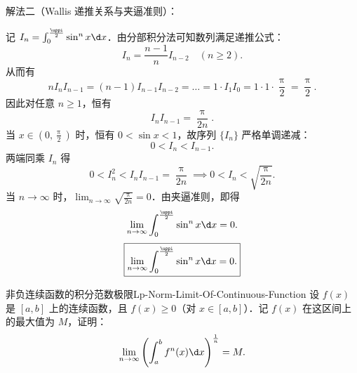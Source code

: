 \begin{solution}
    解法二（Wallis 递推关系与夹逼准则）：

    记 $I_n = \int_0^{\frac{\uppi}{2}} \sin^n x \d x$．由分部积分法可知数列满足递推公式：
    \begin{equation}
        I_n = \frac{n-1}{n} I_{n-2} \quad (n \geqslant 2).
    \end{equation}
    从而有
    \begin{equation}
        n I_n I_{n-1} = (n-1) I_{n-1} I_{n-2} = \dots = 1 \cdot I_1 I_0 = 1 \cdot 1 \cdot \frac{\uppi}{2} = \frac{\uppi}{2}.
    \end{equation}
    因此对任意 $n \geqslant 1$，恒有
    \begin{equation}
        I_n I_{n-1} = \frac{\uppi}{2n}.
    \end{equation}
    当 $x \in \left(0, \frac{\uppi}{2}\right)$ 时，恒有 $0 < \sin x < 1$，故序列 $\{I_n\}$ 严格单调递减：
    \begin{equation}
        0 < I_n < I_{n-1}.
    \end{equation}
    两端同乘 $I_n$ 得
    \begin{equation}
        0 < I_n^2 < I_n I_{n-1} = \frac{\uppi}{2n} \implies 0 < I_n < \sqrt{\frac{\uppi}{2n}}.
    \end{equation}
    当 $n \to \infty$ 时，$\lim_{n\to \infty} \sqrt{\frac{\uppi}{2n}} = 0$．由夹逼准则，即得
    \begin{equation}
        \lim_{n\to \infty} \int_0^{\frac{\uppi}{2}} \sin^n x \d x = 0.
    \end{equation}
    \begin{equation}
        \boxed{\lim_{n\to \infty} \int_0^{\frac{\uppi}{2}} \sin^n x \d x = 0.}
    \end{equation}
\end{solution}

\begin{problem}{非负连续函数的积分范数极限}{Lp-Norm-Limit-Of-Continuous-Function}
    设 $f(x)$ 是 $[a, b]$ 上的连续函数，且 $f(x) \geqslant 0$（对 $x \in [a, b]$）．记 $f(x)$ 在这区间上的最大值为 $M$，证明：
    \begin{equation}
        \lim_{n\to \infty} \left( \int_a^b f^n(x) \d x \right)^{\frac{1}{n}} = M.
    \end{equation}
\end{problem}

